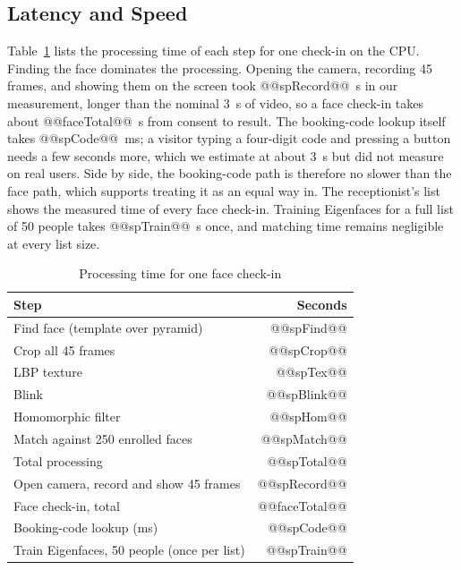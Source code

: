 \documentclass[conference,a4paper]{IEEEtran}
\begin{document}
\subsection{Latency and Speed}
Table~\ref{tab:speed} lists the processing time of each step for one check-in on the CPU. Finding the face dominates the processing. Opening the camera, recording 45 frames, and showing them on the screen took @@spRecord@@~s in our measurement, longer than the nominal 3~s of video, so a face check-in takes about @@faceTotal@@~s from consent to result. The booking-code lookup itself takes @@spCode@@~ms; a visitor typing a four-digit code and pressing a button needs a few seconds more, which we estimate at about 3~s but did not measure on real users. Side by side, the booking-code path is therefore no slower than the face path, which supports treating it as an equal way in. The receptionist's list shows the measured time of every face check-in. Training Eigenfaces for a full list of 50 people takes @@spTrain@@~s once, and matching time remains negligible at every list size.

\begin{table}[t]
\caption{Processing time for one face check-in}
\label{tab:speed}
\centering\footnotesize
\begin{tabular}{@{}lr@{}}
\toprule
Step & Seconds \\
\midrule
Find face (template over pyramid) & @@spFind@@ \\
Crop all 45 frames & @@spCrop@@ \\
LBP texture & @@spTex@@ \\
Blink & @@spBlink@@ \\
Homomorphic filter & @@spHom@@ \\
Match against 250 enrolled faces & @@spMatch@@ \\
\midrule
Total processing & @@spTotal@@ \\
Open camera, record and show 45 frames & @@spRecord@@ \\
\midrule
Face check-in, total & @@faceTotal@@ \\
\midrule
Booking-code lookup (ms) & @@spCode@@ \\
Train Eigenfaces, 50 people (once per list) & @@spTrain@@ \\
\bottomrule
\end{tabular}
\end{table}
\end{document}
